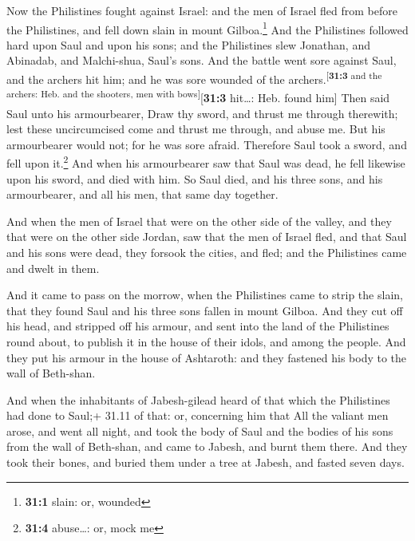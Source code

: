  Now the Philistines fought against Israel: and the men of
Israel fled from before the Philistines, and fell down slain in mount
Gilboa.\footnote{\textbf{31:1} slain: or, wounded}  And
the Philistines followed hard upon Saul and upon his sons; and the
Philistines slew Jonathan, and Abinadab, and Malchi-shua, Saul's sons.
 And the battle went sore against Saul, and the archers
hit him; and he was sore wounded of the
archers.\textsuperscript{{[}\textbf{31:3} and the archers: Heb. and the
shooters, men with bows{]}}{[}\textbf{31:3} hit\ldots: Heb. found him{]}
 Then said Saul unto his armourbearer, Draw thy sword, and
thrust me through therewith; lest these uncircumcised come and thrust me
through, and abuse me. But his armourbearer would not; for he was sore
afraid. Therefore Saul took a sword, and fell upon it.\footnote{\textbf{31:4}
  abuse\ldots: or, mock me}  And when his armourbearer saw
that Saul was dead, he fell likewise upon his sword, and died with him.
 So Saul died, and his three sons, and his armourbearer,
and all his men, that same day together.

 And when the men of Israel that were on the other side of
the valley, and they that were on the other side Jordan, saw that the
men of Israel fled, and that Saul and his sons were dead, they forsook
the cities, and fled; and the Philistines came and dwelt in them.

 And it came to pass on the morrow, when the Philistines
came to strip the slain, that they found Saul and his three sons fallen
in mount Gilboa.  And they cut off his head, and stripped
off his armour, and sent into the land of the Philistines round about,
to publish it in the house of their idols, and among the people.
 And they put his armour in the house of Ashtaroth: and
they fastened his body to the wall of Beth-shan.

 And when the inhabitants of Jabesh-gilead heard of that
which the Philistines had done to Saul;+ 31.11 of that: or, concerning
him that  All the valiant men arose, and went all night,
and took the body of Saul and the bodies of his sons from the wall of
Beth-shan, and came to Jabesh, and burnt them there.  And
they took their bones, and buried them under a tree at Jabesh, and
fasted seven days.
